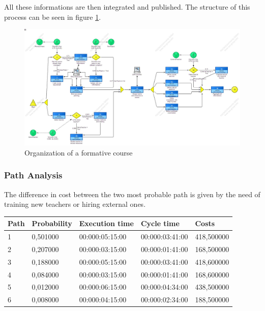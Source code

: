 All these informations are then integrated and published. The structure of
this process can be seen in figure \ref{2img:course_organization}.

\begin{figure}[!ht]
\centering
\includegraphics[scale=0.27, angle=90]{assign2/adonis/imgs/course_organization.jpg}
\caption{Organization of a formative course}
\label{2img:course_organization}
\end{figure}


\subsubsection{Path Analysis}
The difference in cost between the two most probable path is given by the
need of training new teachers or hiring external ones.

\begin{table}[ht!]
\centering
\begin{tabular}{|l|l|l|l|l|}
\hline
Path&Probability&Execution time&Cycle time&Costs\\
\hline
1&0,501000&00:000:05:15:00&00:000:03:41:00&418,500000\\
\hline
2&0,207000&00:000:03:15:00&00:000:01:41:00&168,500000\\
\hline
3&0,188000&00:000:05:15:00&00:000:03:41:00&418,600000\\
\hline
4&0,084000&00:000:03:15:00&00:000:01:41:00&168,600000\\
\hline
5&0,012000&00:000:06:15:00&00:000:04:34:00&438,500000\\
\hline
6&0,008000&00:000:04:15:00&00:000:02:34:00&188,500000\\
\hline
\end{tabular}
\end{table}

